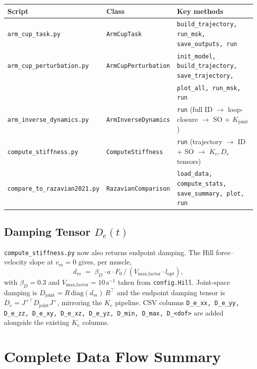 \documentclass[11pt,a4paper]{article}
\begin{document}
\begin{center}
\begin{tabular}{l l l}
\toprule
\textbf{Script} & \textbf{Class} & \textbf{Key methods} \\
\midrule
\texttt{arm\_cup\_task.py}            & \texttt{ArmCupTask}
   & \texttt{build\_trajectory, run\_msk, save\_outputs, run} \\
\texttt{arm\_cup\_perturbation.py}    & \texttt{ArmCupPerturbation}
   & \texttt{init\_model, build\_trajectory, save\_trajectory,} \\
   & & \texttt{plot\_all, run\_msk, run} \\
\texttt{arm\_inverse\_dynamics.py}    & \texttt{ArmInverseDynamics}
   & \texttt{run} (full ID $\to$ loop-closure $\to$ SO + $K_\text{joint}$) \\
\texttt{compute\_stiffness.py}        & \texttt{ComputeStiffness}
   & \texttt{run} (trajectory $\to$ ID + SO $\to$ $K_e, D_e$ tensors) \\
\texttt{compare\_to\_razavian2021.py} & \texttt{RazavianComparison}
   & \texttt{load\_data, compute\_stats, save\_summary, plot, run} \\
\bottomrule
\end{tabular}
\end{center}

\subsection{Damping Tensor $D_e(t)$}

\texttt{compute\_stiffness.py} now also returns endpoint damping.
The Hill force--velocity slope at $v_m=0$ gives, per muscle,
\[
   d_m \;=\; \beta_D \cdot a \cdot F_0 \,/\, (V_\text{max,factor}\cdot l_\text{opt}),
\]
with $\beta_D = 0.3$ and $V_\text{max,factor} = 10\,\mathrm{s}^{-1}$ taken from
\texttt{config.Hill}.  Joint-space damping is
$D_\text{joint} = R\,\text{diag}(d_m)\,R^\top$ and the endpoint damping
tensor is $D_e = J^{+\top} D_\text{joint} J^+$, mirroring the
$K_e$ pipeline.  CSV columns
\texttt{D\_e\_xx, D\_e\_yy, D\_e\_zz, D\_e\_xy, D\_e\_xz, D\_e\_yz,
D\_min, D\_max, D\_<dof>} are added alongside the existing $K_e$ columns.

\section{Complete Data Flow Summary}
\end{document}
